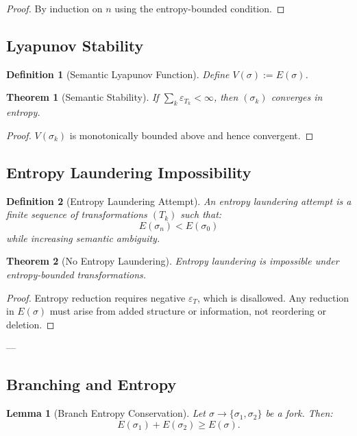 \documentclass[11pt]{article}
\newtheorem{definition}{Definition}
\newtheorem{theorem}{Theorem}
\newtheorem{lemma}{Lemma}
\begin{document}
\begin{proof}
By induction on $n$ using the entropy-bounded condition.
\end{proof}

\subsection{Lyapunov Stability}

\begin{definition}[Semantic Lyapunov Function]
Define $V(\sigma) := E(\sigma)$.
\end{definition}

\begin{theorem}[Semantic Stability]
If $\sum_k \varepsilon_{T_k} < \infty$, then $(\sigma_k)$ converges in entropy.
\end{theorem}

\begin{proof}
$V(\sigma_k)$ is monotonically bounded above and hence convergent.
\end{proof}

\subsection{Entropy Laundering Impossibility}

\begin{definition}[Entropy Laundering Attempt]
An entropy laundering attempt is a finite sequence of transformations $(T_k)$ such that:
\[
E(\sigma_n) < E(\sigma_0)
\]
while increasing semantic ambiguity.
\end{definition}

\begin{theorem}[No Entropy Laundering]
Entropy laundering is impossible under entropy-bounded transformations.
\end{theorem}

\begin{proof}
Entropy reduction requires negative $\varepsilon_T$, which is disallowed. Any reduction in
$E(\sigma)$ must arise from added structure or information, not reordering or deletion.
\end{proof}

---

\subsection{Branching and Entropy}

\begin{lemma}[Branch Entropy Conservation]
Let $\sigma \to \{\sigma_1, \sigma_2\}$ be a fork. Then:
\[
E(\sigma_1) + E(\sigma_2) \ge E(\sigma).
\]
\end{lemma}
\end{document}
